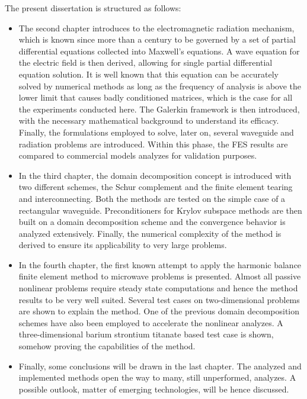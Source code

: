 The present dissertation is structured as follows:
\begin{itemize}
\item The second chapter introduces to the electromagnetic radiation mechanism, which is known since more than a century to be governed by a set of partial differential equations collected into Maxwell's equations. A wave equation for the electric field is then derived, allowing for single partial differential equation solution. It is well known that this equation can be accurately solved by numerical methods as long as the frequency of analysis is above the lower limit that causes badly conditioned matrices, which is the case for all the experiments conducted here. The Galerkin framework is then introduced, with the necessary mathematical background to understand its efficacy. Finally, the formulations employed to solve, later on, several waveguide and radiation problems are introduced. Within this phase, the FES results are compared to commercial models analyzes for validation purposes.
\item In the third chapter, the domain decomposition concept is introduced with two different schemes, the Schur complement and the finite element tearing and interconnecting. Both the methods are tested on the simple case of a rectangular waveguide. Preconditioners for Krylov subspace methods are then built on a domain decomposition scheme and the convergence behavior is analyzed extensively. Finally, the numerical complexity of the method is derived to ensure its applicability to very large problems.
\item In the fourth chapter, the first known attempt to apply the harmonic balance finite element method to microwave problems is presented. Almost all passive nonlinear problems require steady state computations and hence the method results to be very well suited. Several test cases on two-dimensional problems are shown to explain the method. One of the previous domain decomposition schemes have also been employed to accelerate the nonlinear analyzes. A three-dimensional barium strontium titanate based test case is shown, somehow proving the capabilities of the method.
\item Finally, some conclusions will be drawn in the last chapter. The analyzed and implemented methods open the way to many, still unperformed, analyzes. A possible outlook, matter of emerging technologies, will be hence discussed.
\end{itemize}

